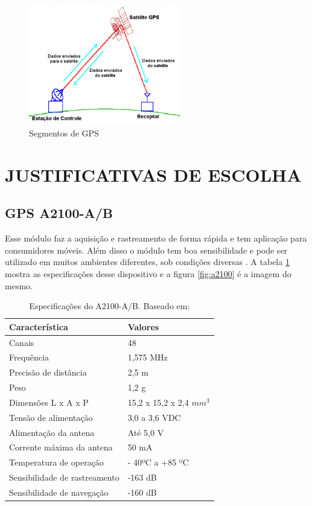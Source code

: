 \begin{figure}[h]
  \centering
  \includegraphics[width=250px, scale=1]{figuras/segmentos_gps}
  \caption{Segmentos de GPS  \cite{9gps}}
\label{fig:segmentos_gps}
\end{figure}


\section{JUSTIFICATIVAS DE ESCOLHA}
\subsection{GPS A2100-A/B}

Esse módulo faz a aquisição e rastreamento de forma rápida e tem aplicação
 para consumidores móveis. Além disso o módulo tem boa sensibilidade e pode
 ser utilizado em muitos ambientes diferentes, sob condições diversas \cite{10gps}.
 A tabela \ref{table:especificacao_gps23} mostra as especificações desse dispositivo e a figura \ref{fig:a2100} é a
 imagem do mesmo.


  \begin{table}[ht]
  \caption{Especificações do A2100-A/B. Baseado em: \cite{10gps}}
  \centering
  \begin{tabular}{| l |  p{4cm} |}
  \hline
  Característica & Valores \\
  \hline
  Canais & 48 \\
  \hline
  Frequência & 1,575 MHz \\
  \hline
  Precisão de distância & 2,5 m \\
  \hline
  Peso & 1,2 g \\
  \hline
  Dimensões L x A x P & 15,2 x 15,2 x 2,4 $ mm ^ {3} $ \\
  \hline
  Tensão de alimentação & 3,0 a 3,6 VDC \\
  \hline
  Alimentação da antena & Até 5,0 V \\
  \hline
  Corrente máxima da antena & 50 mA \\
  \hline
  Temperatura de operação & - 40ºC a +85 ºC \\
  \hline
  Sensibilidade de rastreamento & -163 dB \\
  \hline
  Sensibilidade de navegação & -160 dB \\
  \hline
  \end{tabular}
  \label{table:especificacao_gps23}
  \end{table}


